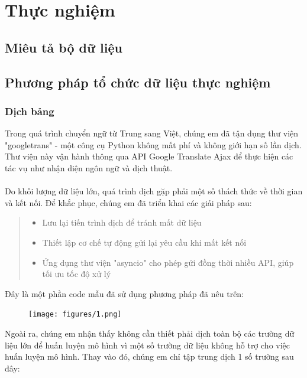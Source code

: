 \section{Thực nghiệm}
\subsection{Miêu tả bộ dữ liệu}
\subsection{Phương pháp tổ chức dữ liệu thực nghiệm}
\label{sec:chuanbidulieu}
\newpage
\subsubsection{Dịch bảng}
Trong quá trình chuyển ngữ từ Trung sang Việt, chúng em đã tận dụng thư viện "googletrans" - một công cụ Python không mất phí và không giới hạn số lần dịch. Thư viện này vận hành thông qua API Google Translate Ajax để thực hiện các tác vụ như nhận diện ngôn ngữ và dịch thuật.\\
\\
Do khối lượng dữ liệu lớn, quá trình dịch gặp phải một số thách thức về thời gian và kết nối. Để khắc phục, chúng em đã triển khai các giải pháp sau:
\begin{quote}
\begin{itemize}
    \item Lưu lại tiến trình dịch để tránh mất dữ liệu
    \item Thiết lập cơ chế tự động gửi lại yêu cầu khi mất kết nối
    \item Ứng dụng thư viện "asyncio" cho phép gửi đồng thời nhiều API, giúp tối ưu tốc độ xử lý
\end{itemize}
\end{quote}
Đây là một phần code mẫu đã sử dụng phương pháp đã nêu trên:\\
\begin{figure}[H]
    \centering
    \texttt{[image: figures/1.png]}
\end{figure}
\newpage
Ngoài ra, chúng em nhận thấy không cần thiết phải dịch toàn bộ các trường dữ liệu lớn để huấn luyện mô hình vì một số trường dữ liệu không hỗ trợ cho việc huấn luyện mô hình. Thay vào đó, chúng em chỉ tập trung dịch 1 số trường sau đây:
